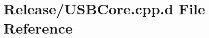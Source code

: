\hypertarget{_release_2_u_s_b_core_8cpp_8d}{\section{\-Release/\-U\-S\-B\-Core.cpp.\-d \-File \-Reference}
\label{_release_2_u_s_b_core_8cpp_8d}
}
